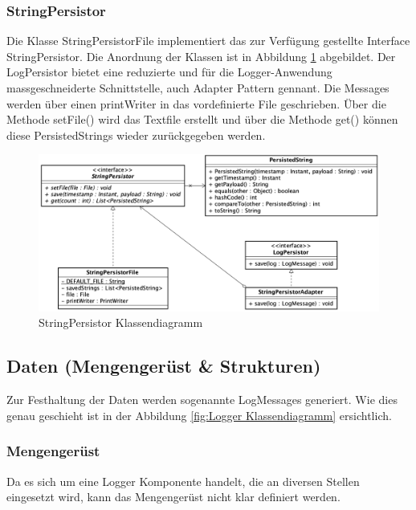 \subsubsection{StringPersistor}
Die Klasse StringPersistorFile implementiert das zur Verfügung gestellte Interface StringPersistor. Die Anordnung der Klassen ist in Abbildung \ref{fig:StringPersistor Klassendiagramm} abgebildet.
Der LogPersistor bietet eine reduzierte und für die Logger-Anwendung massgeschneiderte Schnittstelle, auch Adapter Pattern gennant.
Die Messages werden über einen printWriter in das vordefinierte File geschrieben. Über die Methode setFile() wird das Textfile erstellt und über die Methode get() können diese PersistedStrings wieder zurückgegeben werden. 

\begin{figure}[H]
	\centering
	\includegraphics[width=\textwidth]{2_Architektur/Bilder/stringPersistor.png}
	\caption{StringPersistor Klassendiagramm}
	\label{fig:StringPersistor Klassendiagramm}
\end{figure}

\subsection{Daten (Mengengerüst \& Strukturen)}
Zur Festhaltung der Daten werden sogenannte LogMessages generiert. Wie dies genau geschieht ist in der Abbildung \ref{fig:Logger Klassendiagramm} ersichtlich.

\subsubsection{Mengengerüst}
Da es sich um eine Logger Komponente handelt, die an diversen Stellen eingesetzt wird, kann das Mengengerüst nicht klar definiert werden.

